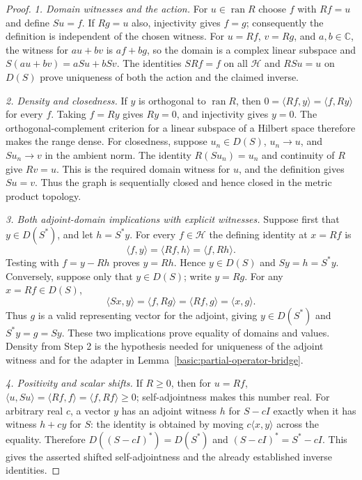 \documentclass[11pt,a4paper]{article}
\theoremstyle{definition}
\theoremstyle{remark}
\begin{document}
\begin{proof}
\emph{1. Domain witnesses and the action.}
For $u\in\operatorname{ran}R$ choose $f$ with $Rf=u$ and define
$Su=f$. If $Rg=u$ also, injectivity gives $f=g$; consequently
the definition is independent of the chosen witness. For $u=Rf$,
$v=Rg$, and $a,b\in\mathbb C$, the witness for $au+bv$ is
$af+bg$, so the domain is a complex linear subspace and
$S(au+bv)=aSu+bSv$. The identities $SRf=f$ on all $\mathcal H$
and $RSu=u$ on $D(S)$ prove uniqueness of both the action and
the claimed inverse.

\emph{2. Density and closedness.}
If $y$ is orthogonal to $\operatorname{ran}R$, then
$0=\langle Rf,y\rangle=\langle f,Ry\rangle$ for every $f$.
Taking $f=Ry$ gives $Ry=0$, and injectivity gives $y=0$.
The orthogonal-complement criterion for a linear subspace of a Hilbert
space therefore makes the range dense. For closedness, suppose
$u_n\in D(S)$, $u_n\to u$, and $Su_n\to v$ in the ambient norm.
The identity $R(Su_n)=u_n$ and continuity of $R$ give $Rv=u$.
This is the required domain witness for $u$, and the definition gives
$Su=v$. Thus the graph is sequentially closed and hence closed in
the metric product topology.

\emph{3. Both adjoint-domain implications with explicit witnesses.}
Suppose first that $y\in D(S^*)$, and let $h=S^*y$. For every
$f\in\mathcal H$ the defining identity at $x=Rf$ is
\[
 \langle f,y\rangle=\langle Rf,h\rangle=\langle f,Rh\rangle.
\]
Testing with $f=y-Rh$ proves $y=Rh$. Hence $y\in D(S)$ and
$Sy=h=S^*y$. Conversely, suppose only that $y\in D(S)$; write
$y=Rg$. For any $x=Rf\in D(S)$,
\[
 \langle Sx,y\rangle=\langle f,Rg\rangle
 =\langle Rf,g\rangle=\langle x,g\rangle.
\]
Thus $g$ is a valid representing vector for the adjoint, giving
$y\in D(S^*)$ and $S^*y=g=Sy$. These two implications prove
equality of domains and values. Density from Step 2 is the hypothesis
needed for uniqueness of the adjoint witness and for the adapter in
Lemma~\ref{basic:partial-operator-bridge}.

\emph{4. Positivity and scalar shifts.}
If $R\geq0$, then for $u=Rf$,
$\langle u,Su\rangle=\langle Rf,f\rangle
=\langle f,Rf\rangle\geq0$; self-adjointness makes this number
real. For arbitrary real $c$, a vector $y$ has an adjoint witness
$h$ for $S-cI$ exactly when it has witness $h+cy$ for $S$:
the identity is obtained by moving $c\langle x,y\rangle$ across
the equality. Therefore $D((S-cI)^*)=D(S^*)$ and
$(S-cI)^*=S^*-cI$. This gives the asserted shifted
self-adjointness and the already established inverse identities.


\end{proof}
\end{document}

